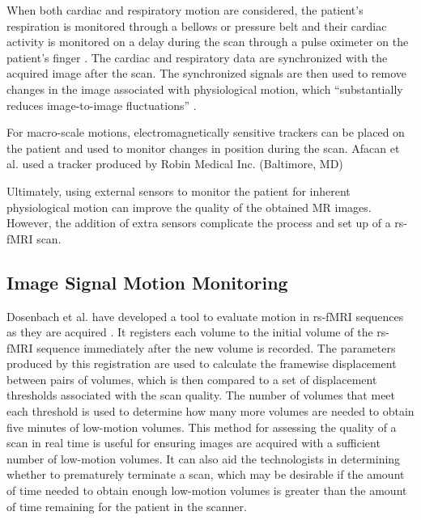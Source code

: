 When both cardiac and respiratory motion are considered, the patient's respiration is monitored through a bellows or pressure belt and their cardiac activity is monitored on a delay during the scan through a pulse oximeter on the patient's finger \cite{Hu1995}. The cardiac and respiratory data are synchronized with the acquired image after the scan. The synchronized signals are then used to remove changes in the image associated with physiological motion, which ``substantially reduces image-to-image fluctuations'' \cite{Hu199}.


For macro-scale motions, electromagnetically sensitive trackers can be placed on the patient and used to monitor changes in position during the scan. Afacan et al. used a tracker produced by Robin Medical Inc. (Baltimore, MD)


Ultimately, using external sensors to monitor the patient for inherent physiological motion can improve the quality of the obtained MR images. However, the addition of extra sensors complicate the process and set up of a rs-fMRI scan.

\subsection{Image Signal Motion Monitoring}



Dosenbach et al. have developed a tool to evaluate motion in rs-fMRI sequences as they are acquired \cite{Dosenbach2017}. It registers each volume to the initial volume of the rs-fMRI sequence immediately after the new volume is recorded. The parameters produced by this registration are used to calculate the framewise displacement between pairs of volumes, which is then compared to a set of displacement thresholds associated with the scan quality. The number of volumes that meet each threshold is used to determine how many more volumes are needed to obtain five minutes of low-motion volumes. This method for assessing the quality of a scan in real time is useful for ensuring images are acquired with a sufficient number of low-motion volumes. It can also aid the technologists in determining whether to prematurely terminate a scan, which may be desirable if the amount of time needed to obtain enough low-motion volumes is greater than the amount of time remaining for the patient in the scanner. 


